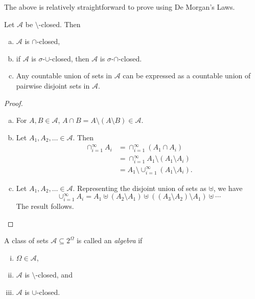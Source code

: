 The above is relatively straightforward to prove using De Morgan's Laws.

\begin{theorem}
\label{if setminus closed}
    Let $\mathcal{A}$ be $\setminus$-closed. Then
    \begin{enumerate}[(a)]
        \item $\mathcal{A}$ is $\cap$-closed,
        \item if $\mathcal{A}$ is $\sigma$-$\cup$-closed, then $\mathcal{A}$ is $\sigma$-$\cap$-closed.
        \item Any countable union of sets in $\mathcal{A}$ can be expressed as a countable union of pairwise disjoint sets in $\mathcal{A}$.
    \end{enumerate}
\end{theorem}
\begin{proof}
~
\begin{enumerate}[(a)]
    \item For $A,B\in\mathcal{A}$, $A\cap B=A\setminus(A\setminus B)\in\mathcal{A}$.
    \item Let $A_1,A_2,\ldots\in\mathcal{A}$. Then
    \begin{align*}
        \cap_{i=1}^\infty A_i &= \cap_{i=1}^\infty (A_1\cap A_i) \\
        &= \cap_{i=1}^\infty A_1\setminus (A_1\setminus A_i) \\
        &= A_1\setminus\cup_{i=1}^\infty (A_1\setminus A_i).
    \end{align*}
    \item Let $A_1,A_2,\ldots\in\mathcal{A}$. Representing the disjoint union of sets as $\uplus$, we have
    $$\cup_{i=1}^\infty A_i = A_1 \uplus (A_2\setminus A_1)\uplus ((A_3\setminus A_2)\setminus A_1)\uplus\cdots$$
    The result follows.
    \end{enumerate}
\end{proof}

\begin{definition}[Algebra]
\label{defAlgebra}
    A class of sets $\mathcal{A}\subseteq2^\Omega$ is called an \textit{algebra} if
    \begin{enumerate}[(i)]
        \item $\Omega\in\mathcal{A}$,
        \item $\mathcal{A}$ is $\setminus$-closed, and
        \item $\mathcal{A}$ is $\cup$-closed.
    \end{enumerate}
\end{definition}

